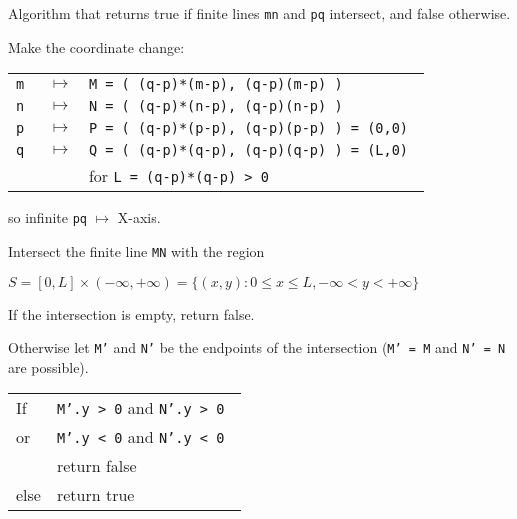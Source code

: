 \documentclass[12pt]{article}
\begin{document}
\begin{algorithm}\label{INTERSECTION-ALGORITHM}
Algorithm that returns true if finite lines {\tt mn} and {\tt pq}
intersect, and false otherwise.

Make the coordinate change:
\begin{center}
\begin{tabular}{rcl}
\tt m & $\longmapsto$ & \tt M = ( (q-p)*(m-p), (q-p)\WH(m-p) ) \\
\tt n & $\longmapsto$ & \tt N = ( (q-p)*(n-p), (q-p)\WH(n-p) ) \\
\tt p & $\longmapsto$ & \tt P = ( (q-p)*(p-p), (q-p)\WH(p-p) ) = (0,0) \\
\tt q & $\longmapsto$ & \tt Q = ( (q-p)*(q-p), (q-p)\WH(q-p) ) = (L,0) \\
      &               & for {\tt L = (q-p)*(q-p) > 0} \\
\end{tabular}
\end{center}

so infinite {\tt pq} $\longmapsto$ X-axis.

Intersect the finite line {\tt MN} with the region
\begin{center}
$S = [0,L]\times(-\infty,+\infty) =
    \{(x,y):0\leq x\leq L,-\infty < y < +\infty\}$
\end{center}

If the intersection is empty, return false.

Otherwise let {\tt M'} and {\tt N'} be the endpoints of the intersection
({\tt M' = M} and {\tt N' = N} are possible).
\begin{center}
\begin{tabular}{ll}
If & {\tt M'.y > 0} and {\tt N'.y > 0 } \\
or & {\tt M'.y < 0} and {\tt N'.y < 0 } \\
   & return false \\
else & return true \\
\end{tabular}
\end{center}

\end{algorithm}
\end{document}
